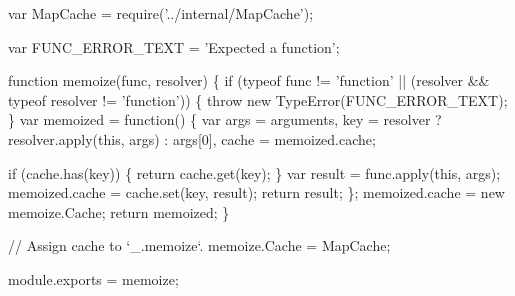 \begin{DoxyCodeInclude}
var MapCache = require(\textcolor{stringliteral}{'../internal/MapCache'});

var FUNC\_ERROR\_TEXT = \textcolor{stringliteral}{'Expected a function'};

\textcolor{keyword}{function} memoize(func, resolver) \{
  \textcolor{keywordflow}{if} (typeof func != \textcolor{stringliteral}{'function'} || (resolver && typeof resolver != \textcolor{stringliteral}{'function'})) \{
    \textcolor{keywordflow}{throw} \textcolor{keyword}{new} TypeError(FUNC\_ERROR\_TEXT);
  \}
  var memoized = \textcolor{keyword}{function}() \{
    var args = arguments,
        key = resolver ? resolver.apply(\textcolor{keyword}{this}, args) : args[0],
        cache = memoized.cache;

    \textcolor{keywordflow}{if} (cache.has(key)) \{
      \textcolor{keywordflow}{return} cache.get(key);
    \}
    var result = func.apply(\textcolor{keyword}{this}, args);
    memoized.cache = cache.set(key, result);
    \textcolor{keywordflow}{return} result;
  \};
  memoized.cache = \textcolor{keyword}{new} memoize.Cache;
  \textcolor{keywordflow}{return} memoized;
\}

\textcolor{comment}{// Assign cache to `\_.memoize`.}
memoize.Cache = MapCache;

module.exports = memoize;
\end{DoxyCodeInclude}
 